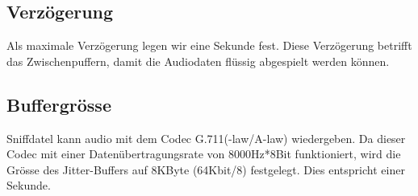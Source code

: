 \documentclass[a4,12pt]{scrartcl}
\begin{document}
\subsection{Verzögerung}
Als maximale Verzögerung legen wir eine Sekunde fest. Diese Verzögerung betrifft das Zwischenpuffern, damit die Audiodaten flüssig abgespielt werden können.
\subsection{Buffergrösse}
Sniffdatel kann audio mit dem Codec G.711(\textmu -law/A-law) wiedergeben. Da dieser Codec mit einer Datenübertragungsrate von 8000Hz*8Bit funktioniert, wird die Grösse des Jitter-Buffers auf 8KByte (64Kbit/8) festgelegt. Dies entspricht einer Sekunde. 
\end{document}
